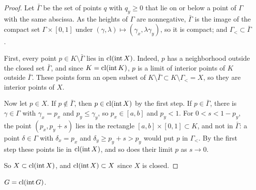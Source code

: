 \begin{proof}
Let $\bar\Gamma$ be the set of points $q$ with $q_y\ge0$ that lie on or below a
point of $\Gamma$ with the same abscissa. As the heights of $\Gamma$ are
nonnegative, $\bar\Gamma$ is the image of the compact set $\Gamma\times[0,1]$
under $(\gamma,\lambda)\mapsto(\gamma_x,\lambda\gamma_y)$, so it is compact; and
$\Gamma_<\subset\bar\Gamma$.

First, every point $p\in K\setminus\bar\Gamma$ lies in $\operatorname{cl}(\operatorname{int} X)$.
Indeed, $p$ has a neighborhood outside the closed set $\bar\Gamma$, and since
$K=\operatorname{cl}(\operatorname{int} K)$, $p$ is a limit of interior points of $K$ outside
$\bar\Gamma$. These points form an open subset of $K\setminus\bar\Gamma\subset
K\setminus\Gamma_<=X$, so they are interior points of $X$.

Now let $p\in X$. If $p\notin\bar\Gamma$, then $p\in\operatorname{cl}(\operatorname{int} X)$ by the
first step. If $p\in\bar\Gamma$, there is $\gamma\in\Gamma$ with $\gamma_x=p_x$
and $p_y\le\gamma_y$, so $p_x\in[a,b]$ and $p_y<1$. For $0<s<1-p_y$, the point
$(p_x,p_y+s)$ lies in the rectangle $[a,b]\times[0,1]\subset K$, and not in
$\bar\Gamma$: a point $\delta\in\Gamma$ with $\delta_x=p_x$ and $\delta_y\ge
p_y+s>p_y$ would put $p$ in $\Gamma_<$. By the first step these points lie in
$\operatorname{cl}(\operatorname{int} X)$, and so does their limit $p$ as $s\to0$.

So $X\subset\operatorname{cl}(\operatorname{int} X)$, and $\operatorname{cl}(\operatorname{int} X)\subset X$ since $X$ is
closed.
\end{proof}

\begin{proposition}\label{prop:regular}
$G=\operatorname{cl}(\operatorname{int}G)$.
\end{proposition}


